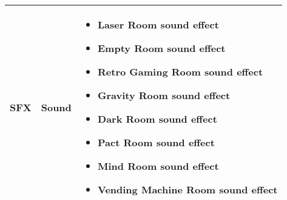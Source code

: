 	\pagebreak
	\begin{tabular}{|m{3cm}|m{3cm}|m{7cm}|}
	\hline
	\textbf{SFX}& Sound & 
	\begin{itemize}
		\item Laser Room sound effect
		\item Empty Room sound effect
		\item Retro Gaming Room sound effect
		\item Gravity Room sound effect
		\item Dark Room sound effect
		\item Pact Room sound effect
		\item Mind Room sound effect
		\item Vending Machine Room sound effect
	
     \end{itemize}\\
     \hline
\end{tabular}	



\pagebreak 